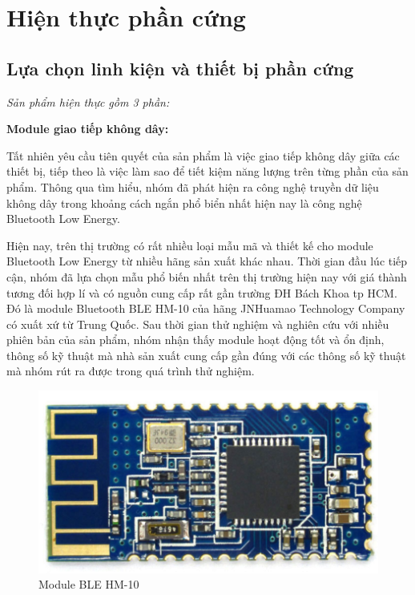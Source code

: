 \newpage

\section{Hiện thực phần cứng}
\subsection{Lựa chọn linh kiện và thiết bị phần cứng}
\textit{Sản phẩm hiện thực gồm 3 phần:}

\textbf{Module giao tiếp không dây:}

Tất nhiên yêu cầu tiên quyết của sản phẩm là việc giao tiếp không dây giữa các thiết bị, tiếp theo là việc làm sao để tiết kiệm năng lượng trên từng phần của sản phẩm. Thông qua tìm hiểu, nhóm đã phát hiện ra công nghệ truyền dữ liệu không dây trong khoảng cách ngắn phổ biển nhất hiện nay là công nghệ Bluetooth Low Energy. 

Hiện nay, trên thị trường có rất nhiều loại mẫu mã và thiết kế cho module Bluetooth Low Energy từ nhiều hãng sản xuất khác nhau. Thời gian đầu lúc tiếp cận, nhóm đã lựa chọn mẫu phổ biến nhất trên thị trường hiện nay với giá thành tương đối hợp lí và có nguồn cung cấp rất gần trường ĐH Bách Khoa tp HCM. Đó là module Bluetooth BLE HM-10 của hãng JNHuamao Technology Company có xuất xứ từ Trung Quốc. Sau thời gian thử nghiệm và nghiên cứu với nhiều phiên bản của sản phẩm, nhóm nhận thấy module hoạt động tốt và ổn định, thông số kỹ thuật mà nhà sản xuất cung cấp gần đúng với các thông số kỹ thuật mà nhóm rút ra được trong quá trình thử nghiệm.

\begin{figure}[h]
	\centering    
	\includegraphics[width=1.0\textwidth]{hm10}
	\caption[Module BLE HM-10]{Module BLE HM-10}
	\label{fig: c2-hm10}
\end{figure}

